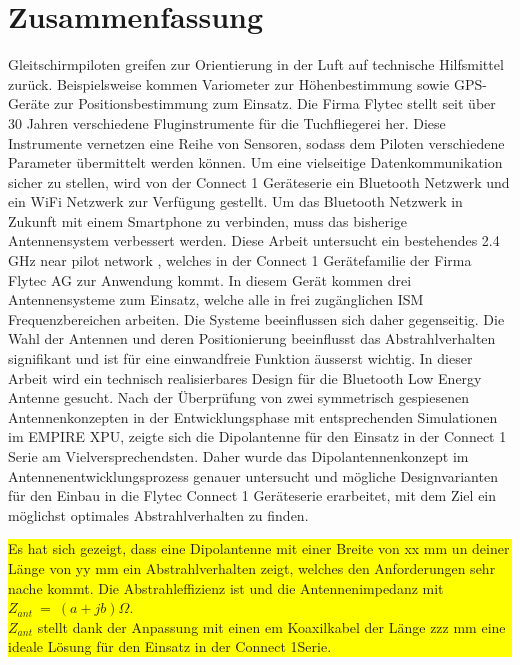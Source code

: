 \newpage
\section*{Zusammenfassung}

Gleitschirmpiloten greifen zur Orientierung in der Luft auf technische Hilfsmittel zurück. Beispielsweise kommen Variometer zur Höhenbestimmung sowie GPS-Geräte zur Positionsbestimmung zum Einsatz. Die Firma Flytec stellt seit über 30 Jahren verschiedene Fluginstrumente für die Tuchfliegerei her. Diese Instrumente vernetzen eine Reihe von Sensoren, sodass dem Piloten verschiedene Parameter übermittelt werden können. Um eine vielseitige Datenkommunikation sicher zu stellen, wird von der \glqq Connect 1 \grqq Geräteserie ein Bluetooth Netzwerk und ein WiFi Netzwerk zur Verfügung gestellt. Um das Bluetooth Netzwerk in Zukunft mit einem Smartphone zu verbinden, muss das bisherige Antennensystem verbessert werden.
Diese Arbeit untersucht ein bestehendes 2.4 GHz \glqq near pilot network \grqq , welches in der \glqq Connect 1 \grqq Gerätefamilie der Firma Flytec AG zur Anwendung kommt. 
In diesem  Gerät kommen drei Antennensysteme zum Einsatz, welche alle in frei zugänglichen ISM Frequenzbereichen arbeiten. Die Systeme beeinflussen sich daher gegenseitig. Die Wahl der Antennen und deren Positionierung beeinflusst das Abstrahlverhalten signifikant und ist für eine einwandfreie Funktion äusserst wichtig. In dieser Arbeit wird ein technisch realisierbares Design für die \glqq Bluetooth Low Energy \grqq Antenne gesucht.  
Nach der Überprüfung von zwei symmetrisch gespiesenen Antennenkonzepten in der Entwicklungsphase mit entsprechenden Simulationen im EMPIRE XPU, zeigte sich die Dipolantenne für den Einsatz in der  \glqq Connect 1 \grqq Serie am Vielversprechendsten.
 Daher wurde das Dipolantennenkonzept im Antennenentwicklungsprozess genauer untersucht und mögliche Designvarianten für den Einbau in die Flytec \glqq Connect 1 \grqq Geräteserie
  erarbeitet, mit dem Ziel ein möglichst optimales Abstrahlverhalten zu finden.\\
  \colorbox{yellow}{\parbox[t]{\textwidth}{Es hat sich gezeigt, dass eine Dipolantenne mit einer Breite von xx mm un deiner Länge von yy mm 
   ein Abstrahlverhalten zeigt, welches den Anforderungen sehr nache kommt. 
   Die Abstrahleffizienz ist und die Antennenimpedanz mit $Z_{ant}\ = \ (a+jb)\Omega$. \\
   $Z_{ant}$ stellt dank der Anpassung mit einen em Koaxilkabel der Länge zzz mm eine ideale Lösung für den Einsatz in der  \glqq Connect 1\grqq Serie. }}


